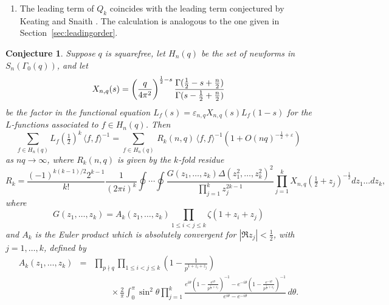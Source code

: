 \documentclass[12pt,letterpaper]{amsart}
\theoremstyle{plain}
\newtheorem{conjecture}[theorem]{Conjecture}
\theoremstyle{definition}
\theoremstyle{remark}
\numberwithin{equation}{subsection}
\numberwithin{theorem}{subsection}
\numberwithin{table}{subsection}
\def\({\left(}
\def\){\right)}
\begin{document}
\begin{enumerate}
\item The leading term of $Q_k$ coincides with the leading term
conjectured by Keating and Snaith \cite{KS2}.  The calculation is
analogous to the one given in Section~\ref{sec:leadingorder}.

\end{enumerate}

\begin{conjecture} \label{thm:sumLfkconjecture}
Suppose $q$ is squarefree, let $H_n(q)$ be the set of newforms in $S_n(\Gamma_0(q))$, 
and let
\begin{equation}
X_{n,q}(s)=\(\frac{q\mathstrut}{4\pi^2}\)^{\frac12-s}
\frac{\Gamma(\frac12-s+\frac{n}{2})}{\Gamma(s-\frac12+\frac{n}{2})}
\end{equation}
be the factor in the functional equation
$L_f(s)=\varepsilon_{n,q} X_{n,q}(s) L_f(1-s)$ for the $L$-functions
associated to $f\in H_n(q)$.
Then
\begin{equation} \label{eqn:Hnqconjecture}
\sum _{  f\in H_n(q)   } {L_f(\tfrac12 )^k}\,{\langle f,f\rangle^{-1}}
 =
 \sum _{  f\in H_n(q)  } \, R_k\left(n,q\right) 
\,{\langle f,f\rangle^{-1}}
 (1 +O(nq)^{-\frac12 + \varepsilon})
\end{equation}
as $nq\to \infty$, where $R_k(n,q)$ is 
given by the $k$-fold residue
\begin{equation}\label{eqn:Rkintegral}
R_k%
= \frac{(-1)^{k(k-1)/2}2^{k-1}}{k!} \frac{1}{(2\pi
i)^{k}}\oint \cdots \oint \frac{G(z_1,
\dots,z_{k})\Delta(z_1^2,\dots,z_{k}^2)^2} {\prod_{j=1}^{k}
z_j^{2k-1}}
\prod_{j=1}^k X_{n,q}(\tfrac12+z_j)^{-\frac12} dz_1\dots dz_{k},
\end{equation}
where
\begin{equation}
G(z_1,\dots,z_k)=A_k(z_1,\dots,z_k) 
\prod_{1\le i< j\le k}\zeta(1+z_i+z_j)
\end{equation}
and $A_k$ is the Euler product which is absolutely convergent for
$|\Re z_j|<\frac12 $, with $j=1,\ldots,k$, defined by
\begin{eqnarray} A_k(z_1,\dots,z_k) & =  &\prod_{p\nmid q} \prod_{1\le i < j \le k}
\left( 1-\frac{1}{p^{1+z_i + z_j}} \right) \nonumber \\&   &\quad\quad\times\frac{2}{\pi}\int_0^\pi
\sin^2\theta\prod_{j=1}^k\frac{e^{i\theta}\left(1-\frac{e^{i\theta}}
{p^{\frac12+ z_j}}\right)^{-1}-
e^{-i\theta}\left(1-\frac{e^{-i\theta}} {p^{\frac12+
z_j}}\right)^{-1}}{e^{i\theta}-e^{-i\theta}}\,d\theta .
 \end{eqnarray}
\end{conjecture}
\end{document}
